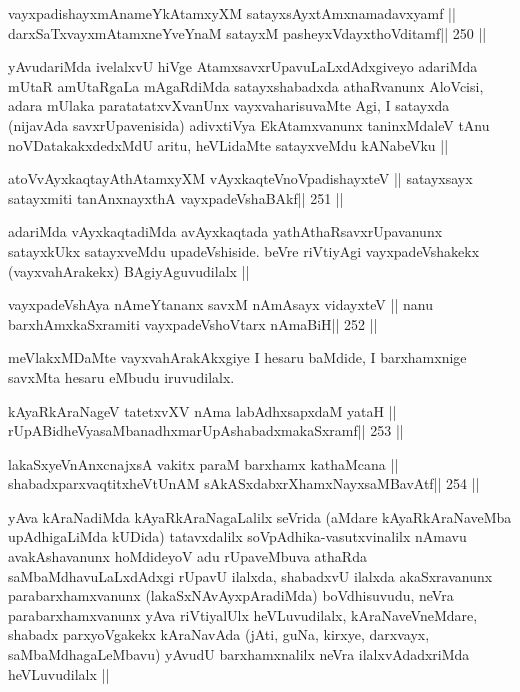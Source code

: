 \begin{shl}
vayxpadishayxmAnameYkAtamxyXM satayxsAyx\s\s tAmxnamadavxyamf ||
darxSaTxvayxmAtamxneYveYnaM satayxM pasheyxVdayxthoVditamf\hfill || 250 ||
\end{shl}

\begin{artha}
yAvudariMda ivelalxvU hiVge AtamxsavxrUpavuLaLxdAdxgiveyo adariMda
mUtaR amUtaRgaLa mAgaRdiMda satayxshabadxda athaRvanunx AloVcisi,
adara mUlaka paratatatxvXvanUnx vayxvaharisuvaMte Agi, I satayxda
(nijavAda savxrUpavenisida) adivxtiVya EkAtamxvanunx taninxMdaleV tAnu
noVDatakakxdedxMdU aritu, heVLidaMte satayxveMdu kANabeVku ||
\end{artha}

\begin{shl}
atoV\s vAyxkaqtayAthAtamxyXM vAyxkaqteVnoVpadishayxteV ||
satayxsayx satayxmiti tanAnxnayxthA vayxpadeVshaBAkf\hfill || 251 ||
\end{shl}

\begin{artha}
adariMda vAyxkaqtadiMda avAyxkaqtada yathAthaRsavxrUpavanunx
satayxkUkx satayxveMdu upadeVshiside. beVre riVtiyAgi vayxpadeVshakekx
(vayxvahArakekx) BAgiyAguvudilalx ||
\end{artha}

\begin{shl}
vayxpadeVshAya nAmeYtananx savxM nAmAsayx vidayxteV ||
nanu barxhAmxkaSxramiti vayxpadeVshoV\s tarx nAmaBiH\hfill || 252 ||
\end{shl}

\begin{artha}
meVlakxMDaMte vayxvahArakAkxgiye I hesaru baMdide, I barxhamxnige
savxMta hesaru eMbudu iruvudilalx. 
\end{artha}


\begin{shl}
kAyaRkAraNageV tatetxvXV nAma labAdhxsapxdaM yataH ||
rUpABidheVyasaMbanadhxmarUpAshabadxmakaSxramf\hfill || 253 ||
\end{shl}

\begin{shl}
lakaSxyeVnAnxcnajxsA vakitx paraM barxhamx kathaMcana ||
shabadxparxvaqtitxheVtUnAM sAkASxdabxrXhamxNayxsaMBavAtf\hfill || 254 ||
\end{shl}

\begin{artha}
yAva kAraNadiMda kAyaRkAraNagaLalilx seVrida (aMdare kAyaRkAraNaveMba
upAdhigaLiMda kUDida) tatavxdalilx soVpAdhika-vasutxvinalilx nAmavu
avakAshavanunx hoMdideyoV adu rUpaveMbuva athaRda
saMbaMdhavuLaLxdAdxgi rUpavU ilalxda, shabadxvU ilalxda akaSxravanunx
parabarxhamxvanunx (lakaSxNAvAyxpAradiMda) boVdhisuvudu, neVra
parabarxhamxvanunx yAva riVtiyalUlx heVLuvudilalx, kAraNaveVneMdare,
shabadx parxyoVgakekx kAraNavAda (jAti, guNa, kirxye, darxvayx,
saMbaMdhagaLeMbavu) yAvudU barxhamxnalilx neVra ilalxvAdadxriMda
heVLuvudilalx ||
\end{artha}

